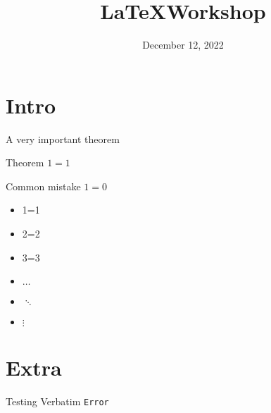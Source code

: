 \documentclass{beamer}
\title{\LaTeX Workshop}
\date{December 12, 2022}
\begin{document}
    \frame{\titlepage}

    \section{Intro}

    \begin{frame}{A very important theorem}
        \begin{block}{Theorem}
            \centering
            $1=1$
        \end{block}
        
        \begin{alertblock}{Common mistake}
            \centering
            $1=0$
        \end{alertblock}
        
        \begin{examples}
            \begin{itemize}
                \item 1=1
                \item 2=2
                \item 3=3
                \item $\dots$
                \item $\ddots$
                \item $\vdots$
            \end{itemize}
        \end{examples}
    \end{frame}

    \section{Extra}

    \begin{frame}[fragile]{Testing Verbatim}
        \verb|Error|
    \end{frame}
    
\end{document}
